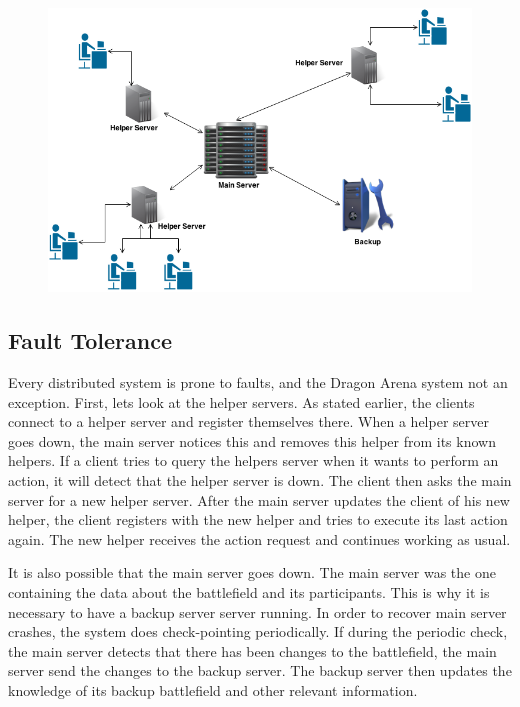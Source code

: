 \begin{figure}[ht]
\includegraphics[scale=0.5]{DCS.png}
\end{figure}

\subsection{Fault Tolerance}
Every distributed system is prone to faults, and the Dragon Arena system not an exception. 
First, lets look at the helper servers. As stated earlier, the clients connect to a helper server and register themselves there.
When a helper server goes down, the main server notices this and removes this helper from its known helpers.
If a client tries to query the helpers server when it wants to perform an action, it will detect that the helper server is down.
The client then asks the main server for a new helper server.
After the main server updates the client of his new helper, the client registers with the new helper and tries to execute its last action again.
The new helper receives the action request and continues working as usual.

It is also possible that the main server goes down. 
The main server was the one containing the data about the battlefield and its participants.
This is why it is necessary to have a backup server server running.  
In order to recover main server crashes, the system does check-pointing periodically.
If during the periodic check, the main server detects that there has been changes to the battlefield, the main server send the changes to the backup server.
The backup server then updates the knowledge of its backup battlefield and other relevant information.

